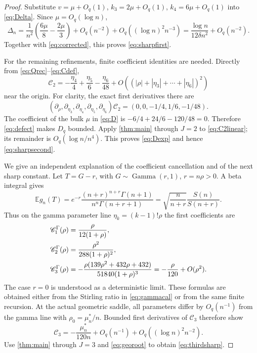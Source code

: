 \documentclass[11pt,a4paper]{article}
\numberwithin{equation}{section}
\theoremstyle{definition}\newtheorem{definition}[theorem]{Definition}
\theoremstyle{remark}\newtheorem{remark}[theorem]{Remark}
\newcommand{\E}{\mathbb E}
\newcommand{\Cj}{\mathscr C}
\begin{document}
\begin{proof}
Substitute $v=\mu+O_q(1)$, $k_3=2\mu+O_q(1)$, $k_4=6\mu+O_q(1)$ into \eqref{eq:Delta}. Since $\mu=O_q(\log n)$,
\[
 \Delta_n=\frac1{n^2}\left(\frac{6\mu}{8}-\frac{2\mu}{3}\right)
       +O_q(n^{-2})+O_q((\log n)^2n^{-3})
 =\frac{\log n}{12\delta n^2}+O_q(n^{-2}).
\]
Together with \eqref{eq:corrected}, this proves \eqref{eq:sharpfirst}.

For the remaining refinements, finite coefficient identities are needed. Directly from \eqref{eq:Qrec}--\eqref{eq:Cdef},
\begin{equation}\label{eq:C2linear}
 \Cj_2=-\frac{\eta_4}{4}+\frac{\eta_5}{6}-\frac{\eta_6}{48}
       +O\!\left((|\rho|+|\eta_3|+\cdots+|\eta_6|)^2\right)
\end{equation}
near the origin. For clarity, the exact first derivatives there are
\[
 (\partial_\rho,\partial_{\eta_3},\partial_{\eta_4},
       \partial_{\eta_5},\partial_{\eta_6})\Cj_2
       =(0,0,-1/4,1/6,-1/48).
\]
The coefficient of the bulk $\mu$ in \eqref{eq:D} is
$-6/4+24/6-120/48=0$. Therefore \eqref{eq:defect} makes $D_q$ bounded. Apply \cref{thm:main} through $J=2$ to \eqref{eq:C2linear}; its remainder is $O_q(\log n/n^4)$. This proves \eqref{eq:Dexp} and hence \eqref{eq:sharpsecond}.

We give an independent explanation of the coefficient cancellation and of the next sharp constant. Let $T=G-r$, with $G\sim\operatorname{Gamma}(r,1)$, $r=n\rho>0$. A beta integral gives
\begin{equation}\label{eq:gammacal}
 \E g_n(T)=e^{-r}\frac{(n+r)^{n+r}\Gamma(n+1)}{n^n\Gamma(n+r+1)}
     =\sqrt{\frac n{n+r}}\frac{S(n)}{S(n+r)}.
\end{equation}
Thus on the gamma parameter line $\eta_k=(k-1)!\rho$ the first coefficients are
\begin{align}
 \Cj_1^{\Gamma}(\rho)&=\frac{\rho}{12(1+\rho)},\notag\\
 \Cj_2^{\Gamma}(\rho)&=\frac{\rho^2}{288(1+\rho)^2},\label{eq:gammacoeff}\\
 \Cj_3^{\Gamma}(\rho)&=
 -\frac{\rho(139\rho^2+432\rho+432)}{51840(1+\rho)^3}
 =-\frac{\rho}{120}+O(\rho^2).\notag
\end{align}
The case $r=0$ is understood as a deterministic limit. These formulas are obtained either from the Stirling ratio in \eqref{eq:gammacal} or from the same finite recursion. At the actual geometric saddle, all parameters differ by $O_q(n^{-1})$ from the gamma line with $\rho_0=\mu_n^*/n$. Bounded first derivatives of $\Cj_3$ therefore show
\[
 \Cj_3=-\frac{\mu_n^*}{120n}+O_q(n^{-1})+O_q((\log n)^2n^{-2}).
\]
Use \cref{thm:main} through $J=3$ and \eqref{eq:georoot} to obtain \eqref{eq:thirdsharp}.
\end{proof}
\end{document}
